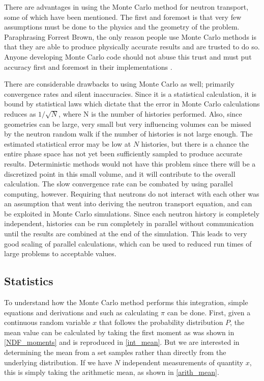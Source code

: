 There are advantages in using the Monte Carlo method for neutron transport, some of which have been mentioned.  The first and foremost is that very few assumptions must be done to the physics and the geometry of the problem. Paraphrasing Forrest Brown,  the only reason people use Monte Carlo methods is that they are able to produce physically accurate results and are trusted to do so.  Anyone developing Monte Carlo code should not abuse this trust and must put accuracy first and foremost in their implementations \cite{fb_snamc}.

There are considerable drawbacks to using Monte Carlo as well; primarily convergence rates and silent inaccuracies.  Since it is a statistical calculation, it is bound by statistical laws which dictate that the error in Monte Carlo calculations reduces as $1/\sqrt{N}$, where N is the number of histories performed.  Also, since geometries can be large, very small but very influencing volumes can be missed by the neutron random walk if the number of histories is not large enough.  The estimated statistical error may be low at $N$ histories, but there is a chance the entire phase space has not yet been sufficiently sampled to produce accurate results.  Deterministic methods would not have this problem since there will be a discretized point in this small volume, and it will contribute to the overall calculation.  The slow convergence rate can be combated by using parallel computing, however.  Requiring that neutrons do not interact with each other was an assumption that went into deriving the neutron transport equation, and can be exploited in Monte Carlo simulations.  Since each neutron history is completely independent, histories can be run completely in parallel without communication until the results are combined at the end of the simulation.  This leads to very good scaling of parallel calculations, which can be used to reduced run times of large problems to acceptable values.

\subsection{Statistics}
\label{sec:stat}

To understand how the Monte Carlo method performs this integration, simple equations and derivations and such as calculating $\pi$ can be done.   First, given a continuous random variable $x$ that follows the probability distribution $P$, the mean value can be calculated by taking the first moment as was shown in \eqref{NDF_moments} and is reproduced in \eqref{int_mean}.  But we are interested in determining the mean from a set samples rather than directly from the underlying distribution.  If we have $N$ independent measurements of quantity $x$, this is simply taking the arithmetic mean, as shown in \eqref{arith_mean}.

